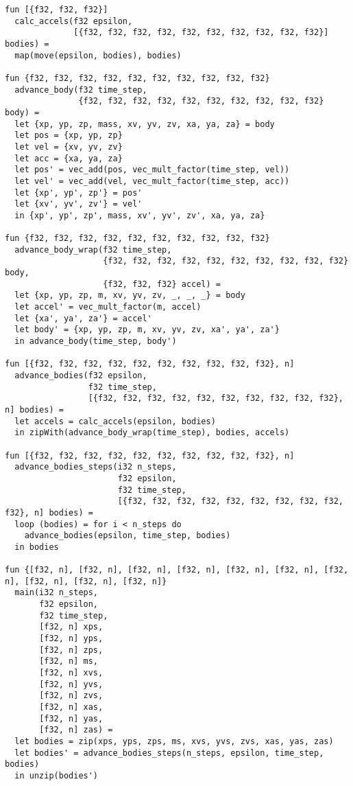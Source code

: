 \begin{lstlisting}
fun [{f32, f32, f32}]
  calc_accels(f32 epsilon,
              [{f32, f32, f32, f32, f32, f32, f32, f32, f32, f32}] bodies) =
  map(move(epsilon, bodies), bodies)

fun {f32, f32, f32, f32, f32, f32, f32, f32, f32, f32}
  advance_body(f32 time_step,
               {f32, f32, f32, f32, f32, f32, f32, f32, f32, f32} body) =
  let {xp, yp, zp, mass, xv, yv, zv, xa, ya, za} = body
  let pos = {xp, yp, zp}
  let vel = {xv, yv, zv}
  let acc = {xa, ya, za}
  let pos' = vec_add(pos, vec_mult_factor(time_step, vel))
  let vel' = vec_add(vel, vec_mult_factor(time_step, acc))
  let {xp', yp', zp'} = pos'
  let {xv', yv', zv'} = vel'
  in {xp', yp', zp', mass, xv', yv', zv', xa, ya, za}
  
fun {f32, f32, f32, f32, f32, f32, f32, f32, f32, f32}
  advance_body_wrap(f32 time_step,
                    {f32, f32, f32, f32, f32, f32, f32, f32, f32, f32} body,
                    {f32, f32, f32} accel) =
  let {xp, yp, zp, m, xv, yv, zv, _, _, _} = body
  let accel' = vec_mult_factor(m, accel)
  let {xa', ya', za'} = accel'
  let body' = {xp, yp, zp, m, xv, yv, zv, xa', ya', za'}
  in advance_body(time_step, body')
  
fun [{f32, f32, f32, f32, f32, f32, f32, f32, f32, f32}, n]
  advance_bodies(f32 epsilon,
                 f32 time_step,
                 [{f32, f32, f32, f32, f32, f32, f32, f32, f32, f32}, n] bodies) =
  let accels = calc_accels(epsilon, bodies)
  in zipWith(advance_body_wrap(time_step), bodies, accels)

fun [{f32, f32, f32, f32, f32, f32, f32, f32, f32, f32}, n]
  advance_bodies_steps(i32 n_steps,
                       f32 epsilon,
                       f32 time_step,
                       [{f32, f32, f32, f32, f32, f32, f32, f32, f32, f32}, n] bodies) =
  loop (bodies) = for i < n_steps do
    advance_bodies(epsilon, time_step, bodies)
  in bodies

fun {[f32, n], [f32, n], [f32, n], [f32, n], [f32, n], [f32, n], [f32, n], [f32, n], [f32, n], [f32, n]}
  main(i32 n_steps,
       f32 epsilon,
       f32 time_step,
       [f32, n] xps,
       [f32, n] yps,
       [f32, n] zps,
       [f32, n] ms,
       [f32, n] xvs,
       [f32, n] yvs,
       [f32, n] zvs,
       [f32, n] xas,
       [f32, n] yas,
       [f32, n] zas) =
  let bodies = zip(xps, yps, zps, ms, xvs, yvs, zvs, xas, yas, zas)
  let bodies' = advance_bodies_steps(n_steps, epsilon, time_step, bodies)
  in unzip(bodies')
\end{lstlisting}

